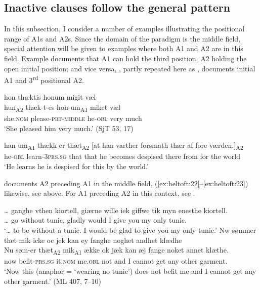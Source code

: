 \documentclass[output=paper]{langscibook}
\begin{document}
\subsection{Inactive clauses follow the general pattern} \label{heltoft:4.2}

In this subsection, I consider a number of examples illustrating the positional range of A1s and A2s. Since the domain of the paradigm is the middle field, special attention will be given to examples where both A1 and A2 are in this field. Example  documents that A1 can hold the third position, A2 holding the open initial position; and vice versa, , partly repeated here as , documents initial A1 and 3\textsuperscript{rd} positional A2.   

\begin{exe}
\ex \label{ex:heltoft:44}
    \glll hon thæktis honum migit væl \\
    hun\textsubscript{A2}    thæk-t-es        hon-um\textsubscript{A1}  miket væl\\
    she.\textsc{nom}  please-\textsc{prt-middle}  he-\textsc{obl}    very much  \\
    \glt ‘She pleased him very much.' (SjT 53, 17)

\ex \label{ex:heltoft:45}
    \gll han-um\textsubscript{A1}   thækk-er     thæt\textsubscript{A2}   [at han varther forsmath   thær af fore værden.]\textsubscript{A2}\\
    he-\textsc{obl}    learn-\textsc{3prs.sg}  that    that he becomes despised there from for {the world}\\
    \glt ‘He learns he is despised for this by the world.'
\end{exe}

 documents A2 preceding A1 in the middle field, (\ref{ex:heltoft:22}--\ref{ex:heltoft:23}) likewise, see above. For A1 preceding A2 in this context, see .

\ea \label{ex:heltoft:46}
\ea 
    \gll… ganghe vthen kiortell, giærne wille iek giffwe tik myn enesthe kiortell.\\
     … go without tunic, gladly would I give you my only tunic.\\
    \glt ‘… to be without a tunic. I would be glad to give you my only tunic.'
\ex 
    \glll Nw  sømmer thet mik icke oc jek {kan ey} fanghe noghet andhet klædhe \\
        Nu    søm-er      thæt\textsubscript{A2}   mik\textsubscript{A1}     ække  ok    jæk {kan æj}  fange noket    annet  klæthe.\\
        now  befit-\textsc{prs.sg}  it.\textsc{nom}    me.\textsc{obl}  not    and   I   cannot   get any     other   garment.\\
    \glt ‘Now this (anaphor = ‘wearing no tunic') does not befit me and I cannot get any other garment.' (ML 407, 7--10)
\z\z
\end{document}
